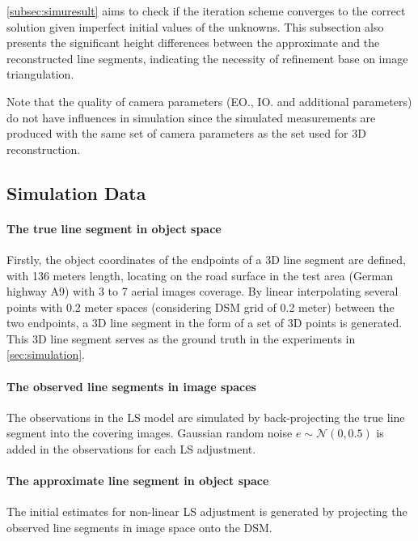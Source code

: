 \cref{subsec:simuresult} aims to check if the iteration scheme converges to the correct solution given imperfect initial values of the unknowns. This subsection also presents the significant height differences between the approximate and the reconstructed line segments, indicating the necessity of refinement base on image triangulation.

Note that the quality of camera parameters (EO., IO. and additional parameters) do not have influences in simulation since the simulated measurements are produced with the same set of camera parameters as the set used for 3D reconstruction.



\subsection{Simulation Data}
\label{subsec:simudata}

\paragraph{The true line segment in object space}
Firstly, the object coordinates of the endpoints of a 3D line segment are defined, with 136 meters length, locating on the road surface in the test area (German highway A9) with 3 to 7 aerial images coverage. By linear interpolating several points with 0.2 meter spaces (considering DSM grid of 0.2 meter) between the two endpoints, a 3D line segment in the form of a set of 3D points is generated. This 3D line segment serves as the ground truth in the experiments in \cref{sec:simulation}. 

\paragraph{The observed line segments in image spaces}
The observations in the LS model are simulated by back-projecting the true line segment into the covering images. Gaussian random noise $e\sim\mathcal{N}(0,0.5)$ is added in the observations for each LS adjustment.

\paragraph{The approximate line segment in object space}
The initial estimates for non-linear LS adjustment is generated by projecting the observed line segments in image space onto the DSM.

